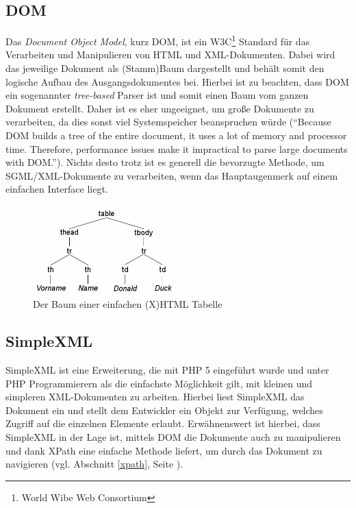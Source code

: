 \subsection{DOM}
Das {\em Document Object Model}, kurz DOM, ist ein W3C\footnote{World
  Wibe Web Consortium} Standard für das Verarbeiten und Manipulieren
von HTML und XML-Dokumenten. Dabei wird das jeweilige Dokument als
(Stamm)Baum dargestellt und behält somit den logische Aufbau des
Ausgangsdokumentes bei. Hierbei ist zu beachten, dass DOM ein
sogenannter {\em tree-based} Parser ist und somit einen Baum vom
ganzen Dokument erstellt. Daher ist es eher ungeeignet, um große
Dokumente zu verarbeiten, da dies sonst viel Systemspeicher
beanspruchen würde (\enquote{Because DOM builds a tree of the entire
  document, it uses a lot of memory and processor time. Therefore,
  performance issues make it impractical to parse large documents with
  DOM.}\cite{www:ibm:xml}). Nichts desto trotz ist es generell die
bevorzugte Methode, um SGML/XML-Dokumente zu verarbeiten, wenn das
Hauptaugenmerk auf einem einfachen Interface liegt.
\begin{figure}[hb]
  \includegraphics[width=0.5\textwidth]{images/dom}
  \caption{Der Baum einer einfachen (X)HTML Tabelle\cite{wiki:de:dom}}
\end{figure}

\subsection{SimpleXML}
SimpleXML ist eine Erweiterung, die mit PHP 5 eingeführt wurde und
unter PHP Programmierern als die einfachste Möglichkeit gilt, mit
kleinen und simpleren XML-Dokumenten zu arbeiten. Hierbei liest
SimpleXML das Dokument ein und stellt dem Entwickler ein Objekt zur
Verfügung, welches Zugriff auf die einzelnen Elemente erlaubt.
Erwähnenswert ist hierbei, dass SimpleXML in der Lage ist, mittels DOM
die Dokumente auch zu manipulieren und dank XPath eine einfache
Methode liefert, um durch das Dokument zu navigieren (vgl. Abschnitt
\ref{xpath}, Seite \pageref{xpath}).
